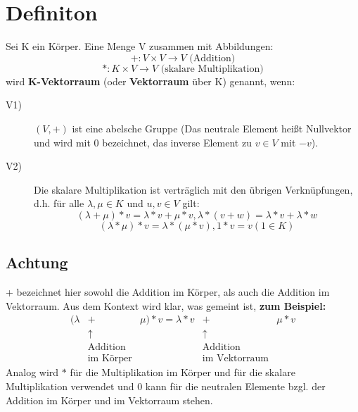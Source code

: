 \documentclass{scrbook}
\begin{document}
\section{Definiton}
Sei K ein Körper. Eine Menge V zusammen mit Abbildungen:
\[
+:V\times V\rightarrow V \text{ (Addition)}
\]
\[
*:K\times V\rightarrow V \text{ (skalare Multiplikation)}
\]
wird \textbf{K-Vektorraum} (oder \textbf{Vektorraum} über K) genannt, wenn:
\begin{description}
\item[V1)] \((V,+)\) ist eine abelsche Gruppe (Das neutrale Element heißt Nullvektor und wird mit 0 bezeichnet, das inverse Element zu \(v \in V\) mit \(-v\)).
\item[V2)] Die skalare Multiplikation ist verträglich mit den übrigen Verknüpfungen, d.h. für alle \(\lambda , \mu \in K\) und \(u,v \in V\) gilt:
\[
(\lambda + \mu)*v = \lambda * v+ \mu *v, \lambda*(v+w) = \lambda *v + \lambda *w
\]
\[
(\lambda * \mu) * v = \lambda *( \mu * v), 1*v = v (1\in K)
\]
\end{description}
\subsection*{Achtung}
+ bezeichnet hier sowohl die Addition im Körper, als auch die Addition im Vektorraum. Aus dem Kontext wird klar, was gemeint ist, \textbf{zum Beispiel:}
\[
\begin{array}{ccccccccccccccc}
(\lambda&+&\mu)*v=\lambda*v&+&\mu * v\\
&\uparrow&&\uparrow\\
&\text{Addition}&&\text{Addition} \\
&\text{im Körper}&&\text{im Vektorraum}
\end{array}
\]
Analog wird \(*\) für die Multiplikation im Körper und für die skalare Multiplikation verwendet und 0 kann für die neutralen Elemente bzgl. der Addition im Körper und im Vektorraum stehen.
\end{document}
